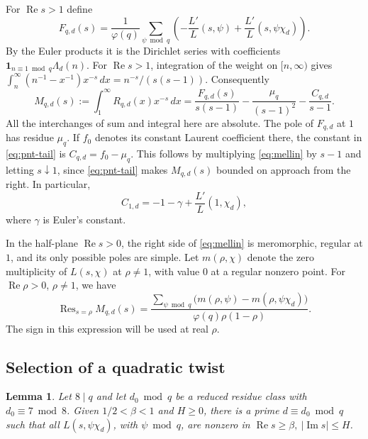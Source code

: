 \documentclass[11pt,reqno]{amsart}
\newtheorem{lemma}[theorem]{Lemma}
\theoremstyle{definition}
\numberwithin{equation}{section}
\newcommand{\re}{\operatorname{Re}}
\newcommand{\im}{\operatorname{Im}}
\newcommand{\res}{\operatorname{Res}}
\begin{document}
For \(\re s>1\) define
\[
 F_{q,d}(s)
 =\frac{1}{\varphi(q)}\sum_{\psi\bmod q}
     \left(-\frac{L'}{L}(s,\psi)+\frac{L'}{L}(s,\psi\chi_d)\right).
\]
By the Euler products it is the Dirichlet series with coefficients
\(\mathbf 1_{n\equiv1\bmod q}\Lambda_d(n)\). For \(\re s>1\), integration
of the weight on \([n,\infty)\) gives
\(\int_n^\infty(n^{-1}-x^{-1})x^{-s}\,dx=n^{-s}/(s(s-1))\).
Consequently
\begin{equation}\label{eq:mellin}
 M_{q,d}(s):=\int_1^\infty R_{q,d}(x)x^{-s}\,dx
 = \frac{F_{q,d}(s)}{s(s-1)}
       -\frac{\mu_q}{(s-1)^2}-\frac{C_{q,d}}{s-1}.
\end{equation}
All the interchanges of sum and integral here are absolute. The pole
of \(F_{q,d}\) at \(1\) has residue \(\mu_q\). If \(f_0\) denotes its
constant Laurent coefficient there, the constant in
\eqref{eq:pnt-tail} is \(C_{q,d}=f_0-\mu_q\). This follows by multiplying
\eqref{eq:mellin} by \(s-1\) and letting \(s\downarrow1\), since
\eqref{eq:pnt-tail} makes \(M_{q,d}(s)\) bounded on approach from the
right. In particular,
\begin{equation}\label{eq:c1}
 C_{1,d}=-1-\gamma+\frac{L'}{L}(1,\chi_d),
\end{equation}
where \(\gamma\) is Euler's constant.

In the half-plane \(\re s>0\), the right side of \eqref{eq:mellin} is
meromorphic, regular at \(1\), and its only possible poles are simple.
Let \(m(\rho,\chi)\) denote the zero multiplicity of \(L(s,\chi)\) at
\(\rho\ne1\), with value \(0\) at a regular nonzero point. For
\(\re\rho>0\), \(\rho\ne1\), we have
\begin{equation}\label{eq:residue}
 \res_{s=\rho}M_{q,d}(s)
 =\frac{\displaystyle\sum_{\psi\bmod q}
                \bigl(m(\rho,\psi)-m(\rho,\psi\chi_d)\bigr)}
        {\varphi(q)\rho(1-\rho)}.
\end{equation}
The sign in this expression will be used at real \(\rho\).

\subsection{Selection of a quadratic twist}

\begin{lemma}\label{lem:twists}
Let \(8\mid q\) and let \(d_0\bmod q\) be a reduced residue class with
\(d_0\equiv 7\bmod 8\). Given \(1/2<\beta<1\) and \(H\ge0\), there is a
prime \(d\equiv d_0\bmod q\) such that all \(L(s,\psi\chi_d)\), with
\(\psi\bmod q\), are nonzero in \(\re s\ge\beta,\ |\im s|\le H\).
\end{lemma}
\end{document}
